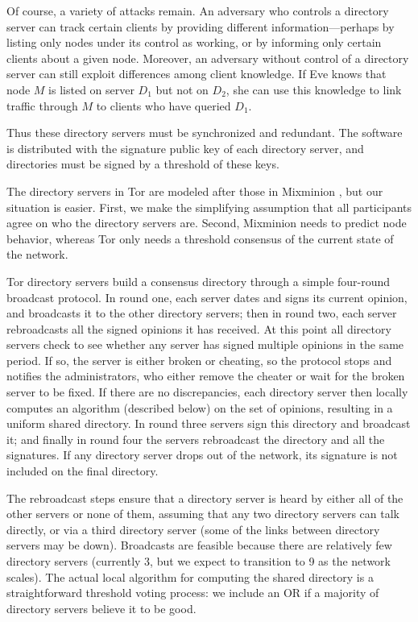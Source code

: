 \documentclass[times,10pt,twocolumn]{article}
\begin{document}
Of course, a variety of attacks remain. An adversary who controls a
directory server can track certain clients by providing different
information---perhaps by listing only nodes under its control
as working, or by informing only certain clients about a given
node. Moreover, an adversary without control of a directory server can
still exploit differences among client knowledge. If Eve knows that
node $M$ is listed on server $D_1$ but not on $D_2$, she can use this
knowledge to link traffic through $M$ to clients who have queried $D_1$.

Thus these directory servers must be synchronized and redundant. The
software is distributed with the signature public key of each directory
server, and directories must be signed by a threshold of these keys.

The directory servers in Tor are modeled after those in Mixminion
\cite{minion-design}, but our situation is easier. First, we make the
simplifying assumption that all participants agree on who the
directory servers are. Second, Mixminion needs to predict node
behavior, whereas Tor only needs a threshold consensus of the current
state of the network.

Tor directory servers build a consensus directory through a simple
four-round broadcast protocol.  In round one, each server dates and
signs its current opinion, and broadcasts it to the other directory
servers; then in round two, each server rebroadcasts all the signed
opinions it has received.  At this point all directory servers check
to see whether any server has signed multiple opinions in the same
period. If so, the server is either broken or cheating, so the protocol
stops and notifies the administrators, who either remove the cheater
or wait for the broken server to be fixed.  If there are no
discrepancies, each directory server then locally computes an algorithm
(described below)
on the set of opinions, resulting in a uniform shared directory. In
round three servers sign this directory and broadcast it; and finally
in round four the servers rebroadcast the directory and all the
signatures.  If any directory server drops out of the network, its
signature is not included on the final directory.

The rebroadcast steps ensure that a directory server is heard by
either all of the other servers or none of them, assuming that any two
directory servers can talk directly, or via a third directory server (some of the
links between directory servers may be down). Broadcasts are feasible
because there are relatively few directory servers (currently 3, but we expect
to transition to 9 as the network scales). The actual local algorithm
for computing the shared directory is a straightforward threshold
voting process: we include an OR if a majority of directory servers
believe it to be good.
\end{document}
